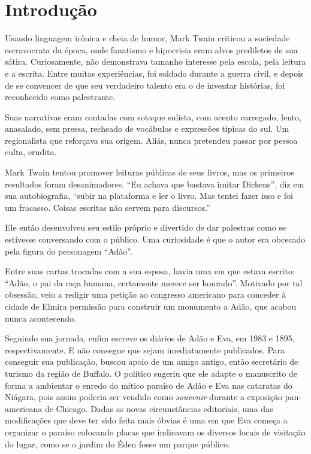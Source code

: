 \documentclass[12pt]{extarticle}
\begin{document}
\section{Introdução}

Usando linguagem irônica e cheia de humor, Mark Twain 
criticou a sociedade escravocrata da época, 
onde fanatismo e hipocrisia eram alvos prediletos de sua sátira.
Curiosamente, não demonstrava tamanho interesse pela escola, pela leitura e a escrita.
Entre muitas experiências, foi soldado durante a guerra civil, 
e depois de se convencer de que seu verdadeiro talento era 
o de inventar histórias, foi reconhecido como palestrante.

Suas narrativas eram contadas com sotaque sulista, 
com acento carregado, lento, anasalado, sem pressa, 
recheado de vocábulos e expressões típicas do sul.
Um regionalista que reforçava sua origem.
Aliás, nunca pretendeu passar por pessoa culta, erudita.

Mark Twain tentou promover leituras públicas de seus livros, 
mas os primeiros resultados foram desanimadores. 
“Eu achava que bastava imitar Dickens”, diz em sua autobiografia, 
“subir na plataforma e ler o livro. Mas tentei fazer isso e foi um fracasso. 
Coisas escritas não servem para discursos.” 

Ele então desenvolveu seu estilo próprio e 
divertido de dar palestras como se estivesse conversando com o público.
Uma curiosidade é que o autor era obcecado pela figura do personagem ``Adão''.

Entre suas cartas trocadas com a sua esposa, 
havia uma em que estava escrito: “Adão, o pai da raça humana, certamente 
merece ser honrado”.
Motivado por tal obsessão, veio a redigir uma petição ao congresso americano 
para conceder à cidade de Elmira permissão para 
construir um monumento a Adão, que acabou nunca acontecendo.

Seguindo sua jornada, enfim escreve os diários de Adão e Eva, 
em 1983 e 1895, respectivamente. E não consegue que sejam imediatamente publicados.
Para conseguir sua publicação, buscou apoio de um amigo antigo, 
então secretário de turismo da região de Buffalo.
O político sugeriu que ele adapte o manuscrito de forma a 
ambientar o enredo do mítico paraíso de Adão e Eva nas cataratas do Niágara, 
pois assim poderia ser vendido como \textit{souvenir} durante a exposição 
pan-americana de Chicago.
Dadas as novas circunstâncias editoriais, uma das modificações que 
deve ter sido feita mais óbvias é uma em que Eva começa a organizar 
o paraíso colocando placas que indicavam os diversos locais de visitação 
do lugar, como se o jardim do Éden fosse um parque público.
\end{document}
